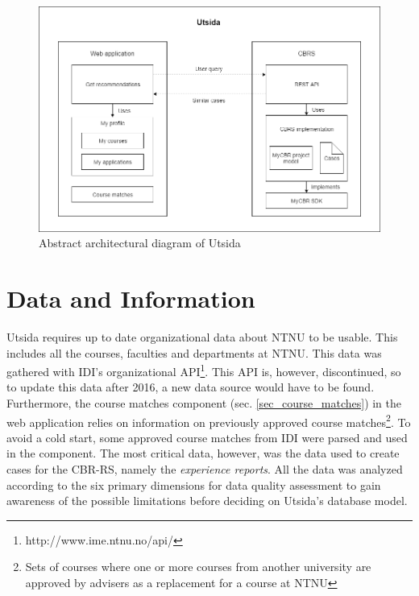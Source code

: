 \begin{figure}[H]
    \centering
    \includegraphics[width=1\textwidth]{fig/system_overview.png}
    \caption{Abstract architectural diagram of Utsida}
    \label{fig:system_overview}
\end{figure}

\section{Data and Information}

Utsida requires up to date organizational data about NTNU to be usable. This includes all the courses, faculties and departments at NTNU. This data was gathered with IDI's organizational API\footnote{http://www.ime.ntnu.no/api/}. This API is, however, discontinued, so to update this data after 2016, a new data source would have to be found. Furthermore, the course matches component (sec. \ref{sec_course_matches}) in the web application relies on information on previously approved course matches\footnote{Sets of courses where one or more courses from another university are approved by advisers as a replacement for a course at NTNU}. To avoid a cold start, some approved course matches from IDI were parsed and used in the component. The most critical data, however, was the data used to create cases for the CBR-RS, namely the \textit{experience reports}. All the data was analyzed according to the six primary dimensions for data quality assessment\cite{askham2013six} to gain awareness of the possible limitations before deciding on Utsida's database model.


